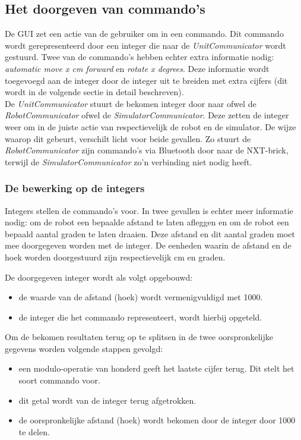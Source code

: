 \documentclass[tt3]{penoverslag}
\begin{document}
\subsection{Het doorgeven van commando's} %
\label{ssec:commands}
De GUI zet een actie van de gebruiker om in een commando. Dit commando wordt gerepresenteerd door een integer die naar de \textit{UnitCommunicator} wordt gestuurd. Twee van de commando's hebben echter extra informatie nodig: \textit{automatic move x cm forward} en \textit{rotate x degrees}. Deze informatie wordt toegevoegd aan de integer door de integer uit te breiden met extra cijfers (dit wordt in de volgende sectie in detail beschreven).\\
De \textit{UnitCommunicator} stuurt de bekomen integer door naar ofwel de \textit{RobotCommunicator} ofwel de \textit{SimulatorCommunicator}. Deze zetten de integer weer om in de juiste actie van respectievelijk de robot en de simulator. De wijze waarop dit gebeurt, verschilt licht voor beide gevallen. Zo stuurt de \textit{RobotCommunicator} zijn commando's via Bluetooth door naar de NXT-brick, terwijl de \textit{SimulatorCommunicator} zo'n verbinding niet nodig heeft.\\

\subsubsection{De bewerking op de integers} %
\label{sssec:integer}
Integers stellen de commando's voor. In twee gevallen is echter meer informatie nodig: om de robot een bepaalde afstand te laten afleggen en om de robot een bepaald aantal graden te laten draaien. Deze afstand en dit aantal graden moet mee doorgegeven worden met de integer. De eenheden waarin de afstand en de hoek worden doorgestuurd zijn respectievelijk cm en graden.

De doorgegeven integer wordt als volgt opgebouwd:

\begin{itemize}
\item de waarde van de afstand (hoek) wordt vermenigvuldigd met 1000.
\item de integer die het commando representeert, wordt hierbij opgeteld.
\end{itemize}

Om de bekomen resultaten terug op te splitsen in de twee oorspronkelijke gegevens worden volgende stappen gevolgd:

\begin{itemize}
\item een modulo-operatie van honderd geeft het laatste cijfer terug. Dit stelt het soort commando voor.
\item dit getal wordt van de integer terug afgetrokken.
\item de oorspronkelijke afstand (hoek) wordt bekomen door de integer door 1000 te delen.
\end{itemize}
\end{document}
